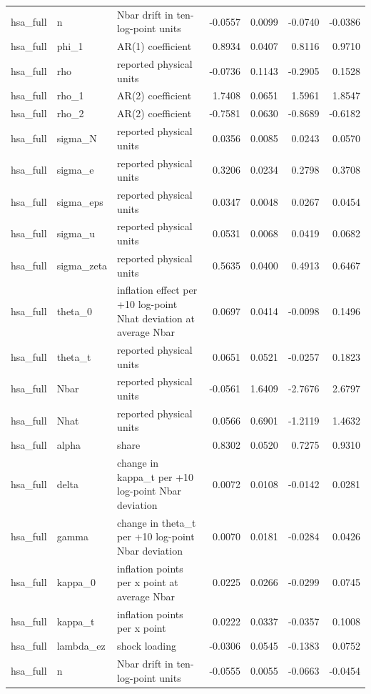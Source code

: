 \begin{tabular}{lllrrrr}
hsa\_full & n & Nbar drift in ten-log-point units & -0.0557 & 0.0099 & -0.0740 & -0.0386 \\
hsa\_full & phi\_1 & AR(1) coefficient & 0.8934 & 0.0407 & 0.8116 & 0.9710 \\
hsa\_full & rho & reported physical units & -0.0736 & 0.1143 & -0.2905 & 0.1528 \\
hsa\_full & rho\_1 & AR(2) coefficient & 1.7408 & 0.0651 & 1.5961 & 1.8547 \\
hsa\_full & rho\_2 & AR(2) coefficient & -0.7581 & 0.0630 & -0.8689 & -0.6182 \\
hsa\_full & sigma\_N & reported physical units & 0.0356 & 0.0085 & 0.0243 & 0.0570 \\
hsa\_full & sigma\_e & reported physical units & 0.3206 & 0.0234 & 0.2798 & 0.3708 \\
hsa\_full & sigma\_eps & reported physical units & 0.0347 & 0.0048 & 0.0267 & 0.0454 \\
hsa\_full & sigma\_u & reported physical units & 0.0531 & 0.0068 & 0.0419 & 0.0682 \\
hsa\_full & sigma\_zeta & reported physical units & 0.5635 & 0.0400 & 0.4913 & 0.6467 \\
hsa\_full & theta\_0 & inflation effect per +10 log-point Nhat deviation at average Nbar & 0.0697 & 0.0414 & -0.0098 & 0.1496 \\
hsa\_full & theta\_t & reported physical units & 0.0651 & 0.0521 & -0.0257 & 0.1823 \\
hsa\_full & Nbar & reported physical units & -0.0561 & 1.6409 & -2.7676 & 2.6797 \\
hsa\_full & Nhat & reported physical units & 0.0566 & 0.6901 & -1.2119 & 1.4632 \\
hsa\_full & alpha & share & 0.8302 & 0.0520 & 0.7275 & 0.9310 \\
hsa\_full & delta & change in kappa\_t per +10 log-point Nbar deviation & 0.0072 & 0.0108 & -0.0142 & 0.0281 \\
hsa\_full & gamma & change in theta\_t per +10 log-point Nbar deviation & 0.0070 & 0.0181 & -0.0284 & 0.0426 \\
hsa\_full & kappa\_0 & inflation points per x point at average Nbar & 0.0225 & 0.0266 & -0.0299 & 0.0745 \\
hsa\_full & kappa\_t & inflation points per x point & 0.0222 & 0.0337 & -0.0357 & 0.1008 \\
hsa\_full & lambda\_ez & shock loading & -0.0306 & 0.0545 & -0.1383 & 0.0752 \\
hsa\_full & n & Nbar drift in ten-log-point units & -0.0555 & 0.0055 & -0.0663 & -0.0454 \\

\end{tabular}
